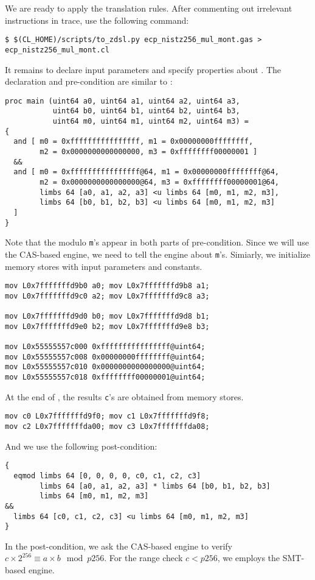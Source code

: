 \documentclass{amsproc}
\begin{document}
We are ready to apply the translation rules. After commenting out
irrelevant instructions in trace, use the following command:
\begin{verbatim}
$ $(CL_HOME)/scripts/to_zdsl.py ecp_nistz256_mul_mont.gas > ecp_nistz256_mul_mont.cl
\end{verbatim}

It remains to declare input parameters and specify properties about
\nistzmul. The declaration and pre-condition are similar to \nistzadd:
\begin{verbatim}
proc main (uint64 a0, uint64 a1, uint64 a2, uint64 a3,
           uint64 b0, uint64 b1, uint64 b2, uint64 b3,
           uint64 m0, uint64 m1, uint64 m2, uint64 m3) =
{
  and [ m0 = 0xffffffffffffffff, m1 = 0x00000000ffffffff,
        m2 = 0x0000000000000000, m3 = 0xffffffff00000001 ]
  &&
  and [ m0 = 0xffffffffffffffff@64, m1 = 0x00000000ffffffff@64,
        m2 = 0x0000000000000000@64, m3 = 0xffffffff00000001@64,
        limbs 64 [a0, a1, a2, a3] <u limbs 64 [m0, m1, m2, m3],
        limbs 64 [b0, b1, b2, b3] <u limbs 64 [m0, m1, m2, m3]
  ]
}
\end{verbatim}
Note that the modulo \texttt{m}'s appear in both parts of
pre-condition. Since we will use the CAS-based engine, we need to tell
the engine about \texttt{m}'s. Simiarly, we initialize memory stores
with input parameters and constants.
\begin{verbatim}
mov L0x7fffffffd9b0 a0; mov L0x7fffffffd9b8 a1;
mov L0x7fffffffd9c0 a2; mov L0x7fffffffd9c8 a3;

mov L0x7fffffffd9d0 b0; mov L0x7fffffffd9d8 b1;
mov L0x7fffffffd9e0 b2; mov L0x7fffffffd9e8 b3;

mov L0x55555557c000 0xffffffffffffffff@uint64;
mov L0x55555557c008 0x00000000ffffffff@uint64;
mov L0x55555557c010 0x0000000000000000@uint64;
mov L0x55555557c018 0xffffffff00000001@uint64;
\end{verbatim}


At the end of \nistzmulcl, the results \texttt{c}'s are obtained from
memory stores.
\begin{verbatim}
mov c0 L0x7fffffffd9f0; mov c1 L0x7fffffffd9f8;
mov c2 L0x7fffffffda00; mov c3 L0x7fffffffda08;
\end{verbatim}
And we use the following post-condition:
\begin{verbatim}
{
  eqmod limbs 64 [0, 0, 0, 0, c0, c1, c2, c3]
        limbs 64 [a0, a1, a2, a3] * limbs 64 [b0, b1, b2, b3]
        limbs 64 [m0, m1, m2, m3]
&&
  limbs 64 [c0, c1, c2, c3] <u limbs 64 [m0, m1, m2, m3]
}
\end{verbatim}
In the post-condition, we ask the CAS-based engine to verify $c \times
2^{256} \equiv a \times b \mod p256$. For the range check $c < p256$,
we employs the SMT-based engine.
\end{document}
